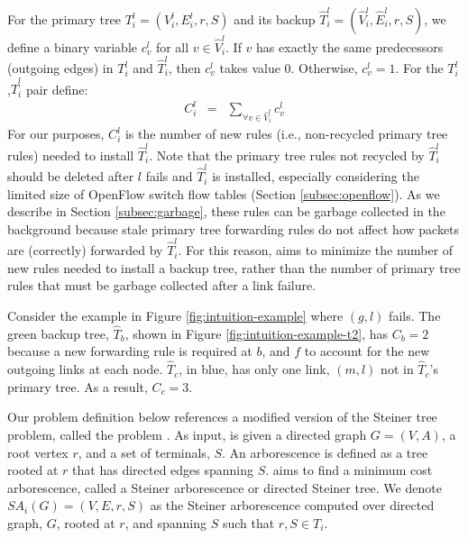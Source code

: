 For the primary tree $T^l_i = (V^l_i,E^l_i,r,S)$ and its backup $\hat{T}^l_i=(\hat{V}^l_i,\hat{E}^l_i,r,S)$, we define a binary variable $c_v^l$ for all $v \in \hat{V}_i^l$. 
If $v$ has exactly the same predecessors (outgoing edges) in $T^l_i$ and $\hat{T}^l_i$, then $c_v^l$ takes value $0$.  Otherwise, $c_v^l=1$.  
For the $T^l_i$,$\hat{T}^l_i$ pair define:
\begin{eqnarray}
\label{eqn:control-overhead}
 C_i^l &=&  \sum_{\forall v \in \hat{V}_i^l} c_v^l 
\end{eqnarray}
For our purposes, $C_i^l$ is the number of new rules (i.e., non-recycled primary tree rules) needed to install $\hat{T}^l_i$.  Note that the primary tree rules not recycled by 
$\hat{T}^l_i$ should be deleted after $l$ fails and $\hat{T}^l_i$ is installed, especially considering the limited size of OpenFlow switch flow tables 
(Section \ref{subsec:openflow}).  As we describe in Section \ref{subsec:garbage}, these rules can be garbage collected in the background because
stale primary tree forwarding rules do not affect how packets are (correctly) forwarded by $\hat{T}^l_i$. 
For this reason, \mc aims to minimize the number of new rules needed to install a backup tree, rather than the number of primary tree rules that must be garbage collected after a link failure.

Consider the example in Figure \ref{fig:intuition-example} where $(g,l)$ fails. The green backup tree, $\hat{T}_b$, shown in Figure \ref{fig:intuition-example-t2}, has $C_b =2$ because 
a new forwarding rule is required at $b$, and $f$ to account for the new outgoing links at each node. $\hat{T}_c$, in blue, has
only one link, $(m,l)$ not in $\hat{T}_c$'s primary tree. As a result, $C_c =3$.

Our \mc problem definition below references a modified version of the Steiner tree problem, called the \arbor problem \cite{Charikar98}. As input, \arbor is given 
a directed graph $G=(V,A)$, a root vertex $r$, and a set of terminals, $S$. An arborescence is defined as a tree rooted at $r$ that has directed edges spanning $S$. 
\arbor aims to find a minimum cost arborescence, called a Steiner arborescence or directed Steiner tree. We denote $SA_i(G) = (V,E,r,S)$ as the Steiner arborescence computed over 
directed graph, $G$, rooted at $r$, and spanning $S$ such that $r, S \in T_i$. %

